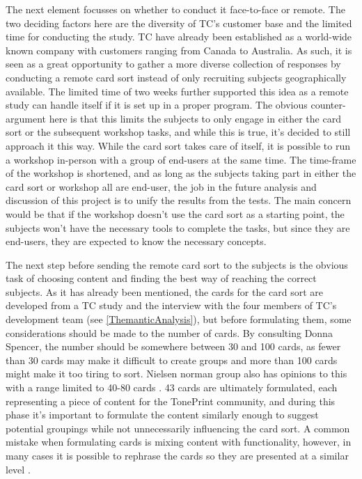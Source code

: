 The next element focusses on whether to conduct it face-to-face or remote. The two deciding factors here are the diversity of TC's customer base and the limited time for conducting the study. TC have already been established as a world-wide known company with customers ranging from Canada to Australia. As such, it is seen as a great opportunity to gather a more diverse collection of responses by conducting a remote card sort instead of only recruiting subjects geographically available. The limited time of two weeks further supported this idea as a remote study can handle itself if it is set up in a proper program. The obvious counter-argument here is that this limits the subjects to only engage in either the card sort or the subsequent workshop tasks, and while this is true, it's decided to still approach it this way. While the card sort takes care of itself, it is possible to run a workshop in-person with a group of end-users at the same time. The time-frame of the workshop is shortened, and as long as the subjects taking part in either the card sort or workshop all are end-user, the job in the future analysis and discussion of this project is to unify the results from the tests. The main concern would be that if the workshop doesn't use the card sort as a starting point, the subjects won't have the necessary tools to complete the tasks, but since they are end-users, they are expected to know the necessary concepts.

The next step before sending the remote card sort to the subjects is the obvious task of choosing content and finding the best way of reaching the correct subjects. As it has already been mentioned, the cards for the card sort are developed from a TC study \parencite{PDF:BrugerWorkshopUserTonePrints} and the interview with the four members of TC's development team (see \autoref{ThemanticAnalysis}), but before formulating them, some considerations should be made to the number of cards. By consulting Donna Spencer, the number should be somewhere between 30 and 100 cards, as fewer than 30 cards may make it difficult to create groups and more than 100 cards might make it too tiring to sort. Nielsen norman group also has opinions to this with a range limited to 40-80 cards \parencite{WEB:NielsenNormanCardSort}. 43 cards are ultimately formulated, each representing a piece of content for the TonePrint community, and during this phase it's important to formulate the content similarly enough to suggest potential groupings while not unnecessarily influencing the card sort. A common mistake when formulating cards is mixing content with functionality, however, in many cases it is possible to rephrase the cards so they are presented at a similar level \parencite[][103-107]{WEB:DonnaSpencer}. 


